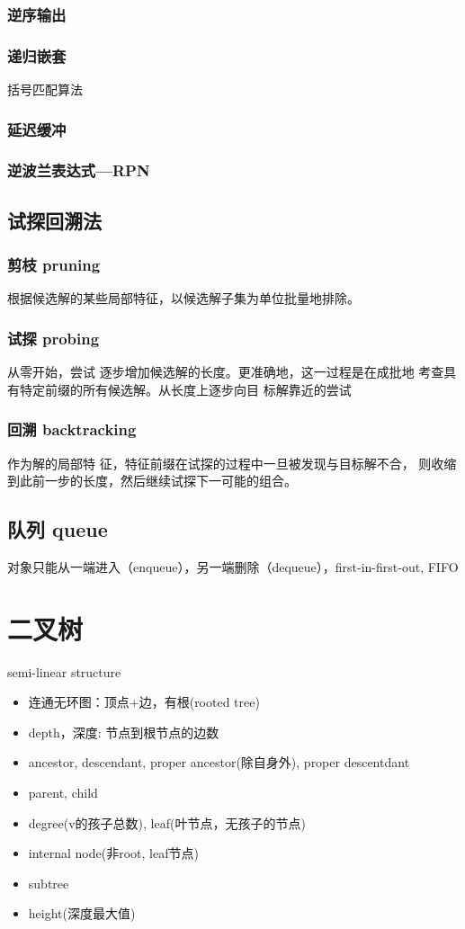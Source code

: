 \subsection{逆序输出}
\subsection{递归嵌套}
括号匹配算法
\subsection{延迟缓冲}
\subsection{逆波兰表达式---RPN}

\section{试探回溯法}
\subsection{剪枝 pruning}
根据候选解的某些局部特征，以候选解子集为单位批量地排除。
\subsection{试探 probing}
从零开始，尝试 逐步增加候选解的长度。更准确地，这一过程是在成批地 考查具有特定前缀的所有候选解。从长度上逐步向目 标解靠近的尝试
\subsection{回溯 backtracking}
作为解的局部特 征，特征前缀在试探的过程中一旦被发现与目标解不合， 则收缩到此前一步的长度，然后继续试探下一可能的组合。

\section{队列 queue}
对象只能从一端进入（enqueue），另一端删除（dequeue），first-in-first-out, FIFO

\chapter{二叉树}
semi-linear structure 
\begin{itemize}
\item 连通无环图：顶点+边，有根(rooted tree)
\item depth，深度: 节点到根节点的边数
\item ancestor, descendant, proper ancestor(除自身外), proper descentdant
\item parent, child
\item degree(v的孩子总数), leaf(叶节点，无孩子的节点)
\item internal node(非root, leaf节点)
\item subtree
\item height(深度最大值)
\end{itemize}

